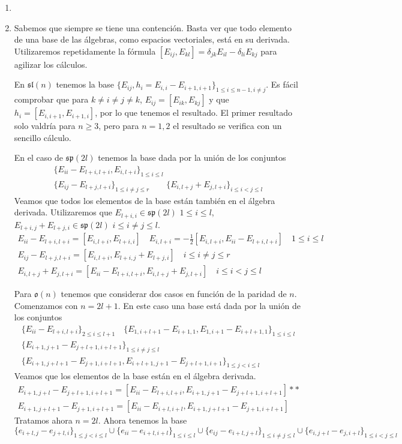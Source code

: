 \documentclass[twoside]{article}
\begin{document}
\begin{solucion}
\begin{enumerate}
\item[]
\item Sabemos que siempre se tiene una contención. Basta ver que todo elemento de una base de las álgebras, como espacios vectoriales, está en su derivada. Utilizaremos repetidamente la fórmula $[E_{ij},E_{kl}]=\delta_{jk}E_{il}-\delta_{li}E_{kj}$ para agilizar los cálculos.

En $\mathfrak{sl}(n)$ tenemos la base $\{E_{ij}, h_i=E_{i,i}-E_{i+1,i+1}\}_{1\leq i\leq n-1, i\neq j}$. Es fácil comprobar que para $k\neq i\neq j\neq k$, $E_{ij}=[E_{ik},E_{kj}]$ y que $h_i=[E_{i,i+1},E_{i+1,i}]$, por lo que tenemos el resultado. El primer resultado solo valdría para $n\geq 3$, pero para $n=1,2$ el resultado se verifica con un sencillo cálculo.

En el caso de $\mathfrak{sp}(2l)$ tenemos la base dada por la unión de los conjuntos
\begin{gather*}
\{E_{ii}-E_{l+i,l+i}, E_{i,l+i}\}_{1\leq i \leq l} \\
\{E_{ij}-E_{l+j,l+i}\}_{1\leq i\neq j\leq r} \qquad \{E_{i,l+j}+E_{j,l+i}\}_{i\leq i<j\leq l}
\end{gather*}
Veamos que todos los elementos de la base están también en el álgebra derivada. Utilizaremos que $E_{l+i,i} \in \mathfrak{sp}(2l)$ $1\leq i \leq l$, $E_{l+i,j}+E_{l+j,i} \in \mathfrak{sp}(2l)$ $i \leq i\neq j \leq l$.
\begin{gather*}
E_{ii}-E_{l+i,l+i}=[E_{i,l+i},E_{l+i,i}] \quad E_{i,l+i} = -\frac{1}{2}[E_{i,l+i},E_{ii}-E_{l+i,l+i}] \quad 1\leq i \leq l\\
E_{ij}-E_{l+j,l+i}=[E_{i,l+i},E_{l+i,j}+E_{l+j,i}] \quad i \leq i \neq j \leq r\\
E_{i,l+j}+E_{j,l+i}=[E_{ii}-E_{l+i,l+i},E_{i,l+j}+E_{j,l+i}]\quad i \leq i < j \leq l
\end{gather*}

Para $\mathfrak{o}(n)$ tenemos que considerar dos casos en función de la paridad de $n$. Comenzamos con $n=2l+1$. En este caso una base está dada por la unión de los conjuntos
\begin{gather*}
\{E_{ii}-E_{l+i,l+i}\}_{2\leq i\leq l+1} \quad \{E_{1,i+l+1}-E_{i+1,1}, E_{1,i+1}-E_{i+l+1,1}\}_{1\leq i\leq l}\\
\{E_{i+1,j+1}-E_{j+l+1,i+l+1}\}_{1\leq i\neq j\leq l}\\
\{E_{i+1,j+l+1}-E_{j+1,i+l+1}, E_{i+l+1,j+1}-E_{j+l+1,i+1}\}_{1\leq j<i\leq l} 
\end{gather*}
Veamos que los elementos de la base están en el álgebra derivada.
\begin{gather*}
E_{i+1,j+l}-E_{j+l+1,i+l+1}=[E_{ii}-E_{l+i,l+i},E_{i+1,j+1}-E_{j+l+1,i+l+1}]**\\
E_{i+1,j+l+1}-E_{j+1,i+l+1}=[E_{ii}-E_{i+l,i+l},E_{i+1,j+l+1}-E_{j+1,i+l+1}]
\end{gather*}
Tratamos ahora $n=2l$. Ahora tenemos la base
\[
\{e_{i+l,j}-e_{j+l,i}\}_{1\leq j<i\leq l}\cup\{e_{ii}-e_{i+l,i+l}\}_{1\leq i\leq l}\cup\{e_{ij}-e_{i+l,j+l}\}_{1\leq i\neq j\leq l}\cup\{e_{i,j+l}-e_{j,i+l}\}_{1\leq i<j\leq l}
\]


\end{enumerate}
\end{solucion}
\end{document}
